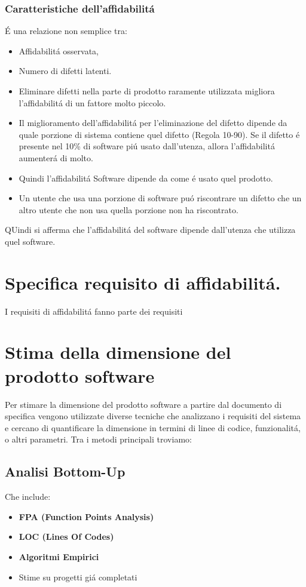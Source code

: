 \documentclass[11pt]{article}
\begin{document}
\subsubsection{Caratteristiche dell'affidabilitá}
\label{sec:org8c8ca76}
É una relazione non semplice tra:
\begin{itemize}
\item Affidabilitá osservata,
\item Numero di difetti latenti.

\item Eliminare difetti nella parte di prodotto raramente utilizzata migliora l'affidabilitá di un fattore molto piccolo.
\item Il miglioramento dell'affidabilitá per l'eliminazione del difetto dipende da quale porzione di sistema contiene quel difetto (Regola 10-90). Se il difetto é presente nel 10\% di software piú usato dall'utenza, allora l'affidabilitá aumenterá di molto.
\item Quindi l'affidabilitá Software dipende da come é usato quel prodotto.
\item Un utente che usa una porzione di software puó riscontrare un difetto che un altro utente che non usa quella porzione non ha riscontrato.
\end{itemize}
QUindi si afferma che l'affidabilitá del software dipende dall'utenza che utilizza quel software.
\section{Specifica requisito di affidabilitá.}
\label{sec:org9299ab4}
I requisiti di affidabilitá fanno parte dei requisiti
\section{Stima della dimensione del prodotto software}
\label{sec:org56cee40}
Per stimare la dimensione del prodotto software a partire dal documento di specifica vengono utilizzate diverse tecniche che analizzano i requisiti del sistema e cercano di quantificare la dimensione in termini di linee di codice, funzionalitá, o altri parametri. Tra i metodi principali troviamo:
\subsection{Analisi Bottom-Up}
\label{sec:orgca83bda}
Che include:
\begin{itemize}
\item \textbf{\textbf{FPA (Function Points Analysis)}}
\item \textbf{\textbf{LOC (Lines Of Codes)}}
\item \textbf{\textbf{Algoritmi Empirici}}
\item Stime su progetti giá completati
\end{itemize}
\end{document}
